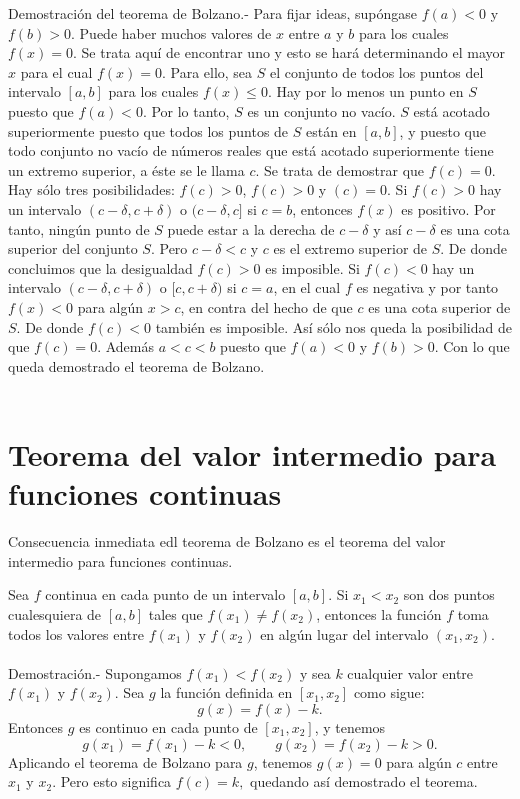 Demostración del teorema de Bolzano.- Para fijar ideas, supóngase $f(a)<0$ y $f(b)>0$. Puede haber muchos valores de $x$ entre $a$ y $b$ para los cuales $f(x)=0$. Se trata aquí de encontrar uno y esto se hará determinando el mayor $x$ para el cual $f(x)=0$. Para ello, sea $S$ el conjunto de todos los puntos del intervalo $[a,b]$ para los cuales $f(x)\leq 0$. Hay por lo menos un punto en $S$ puesto que $f(a)<0$. Por lo tanto, $S$ es un conjunto no vacío. $S$ está acotado superiormente puesto que todos los puntos de $S$ están en $[a,b]$, y puesto que todo conjunto no vacío de números reales que está acotado superiormente tiene un extremo superior, a éste se le llama $c$. Se trata de demostrar que $f(c)=0$.\\
Hay sólo tres posibilidades: $f(c)>0$, $f(c)>0$ y $(c)=0$. Si $f(c)>0$ hay un intervalo $(c-\delta,c+\delta)$  o $(c-\delta,c]$ si $c=b$, entonces $f(x)$ es positivo. Por tanto, ningún punto de $S$ puede estar a la derecha de $c-\delta$ y así $c-\delta$ es una cota superior del conjunto $S$. Pero $c-\delta < c$ y $c$ es el extremo superior de $S$. De donde concluimos que la desigualdad $f(c)>0$ es imposible. Si $f(c)<0$ hay un intervalo $(c-\delta,c+\delta)$ o $[c,c+\delta)$ si $c=a$, en el cual $f$ es negativa y por tanto $f(x)<0$ para algún $x>c$, en contra del hecho de que $c$ es una cota superior de $S$. De donde $f(c)<0$ también es imposible. Así sólo nos queda la posibilidad de que $f(c)=0$. Además $a<c<b$ puesto que $f(a)<0$ y $f(b)>0$. Con lo que queda demostrado el teorema de Bolzano.\\\\


\section{Teorema del valor intermedio para funciones continuas}

Consecuencia inmediata edl teorema de Bolzano es el teorema del valor intermedio para funciones continuas.

\begin{teo}
    Sea $f$ continua en cada punto de un intervalo $[a,b]$. Si $x_1<x_2$ son dos puntos cualesquiera de $[a,b]$ tales que $f(x_1)\neq f(x_2)$, entonces la función $f$ toma todos los valores entre $f(x_1)$ y $f(x_2)$ en algún lugar del intervalo $(x_1,x_2)$.\\\\
	Demostración.-\; Supongamos $f(x_1)<f(x_2)$ y sea $k$ cualquier valor entre $f(x_1)$ y $f(x_2)$. Sea $g$ la función definida en $[x_1,x_2]$ como sigue:
	$$g(x)=f(x)-k.$$
	Entonces $g$ es continuo en cada punto de $[x_1,x_2]$, y tenemos
	$$g(x_1)=f(x_1)-k<0,\qquad g(x_2)=f(x_2)-k>0.$$
	Aplicando el teorema de Bolzano para $g$, tenemos $g(x)=0$ para algún $c$ entre $x_1$ y $x_2$. Pero esto significa $f(c)=k,$ quedando así demostrado el teorema.\\\\
\end{teo}

